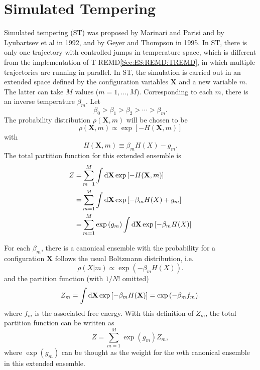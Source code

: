 \section{Simulated Tempering\label{Sec:ES:ST}}
Simulated tempering (ST) was proposed by Marinari and Parisi\cite{MarinariEPL1992} and by Lyubartsev et al\cite{LyubartsevJCP1992} in 1992, and by Geyer and Thompson\cite{GeyerJASA1995} in 1995. In ST, there is only one trajectory with controlled jumps in temperature space, which is different from the implementation of T-REMD\ref{Sec:ES:REMD:TREMD}, in which multiple trajectories are running in parallel. In ST, the simulation is carried out in an extended space defined by the configuration variables $\mathbf{X}$ and a new variable $m$. The latter can take $M$ values ($m=1,\dots,M$). Corresponding to each $m$, there is an inverse temperature $\beta_m$. Let
\begin{equation}
    \beta_0>\beta_1>\beta_2>\cdots >\beta_m.
\end{equation}
The probability distribution $\rho(\mathbf{X},m)$ will be chosen to be 
\begin{equation}
  \rho(\mathbf{X},m)\propto \exp{\left[-H(\mathbf{X},m)\right]}
\end{equation}
with 
\begin{equation}
  H(\mathbf{X},m)\equiv \beta_m H(X)-g_m.
\end{equation}
The total partition function for this extended ensemble is
\begin{align}
    Z=&\sum_{m=1}^M \int\mathop{}\!\mathrm{d} \mathbf{X} \exp{\left[-H(\mathbf{X},m)\right]}\notag\\
     =&\sum_{m=1}^M \int\mathop{}\!\mathrm{d} \mathbf{X} \exp{\left[-\beta_m H(X)+g_m\right]}\notag\\
     =&\sum_{m=1}^M \exp{(g_m)}\int\mathop{}\!\mathrm{d} \mathbf{X} \exp{\left[-\beta_m H(X)\right]}
\end{align}

For each $\beta_m$, there is a canonical ensemble with the probability for a configuration $\mathbf{X}$ follows the usual Boltzmann distribution, i.e. 
\begin{equation}
    \rho(X|m)\propto \exp{(-\beta_m H(X))}.
\end{equation}
and the partition function (with $1/N!$ omitted)
\begin{equation}
    Z_m=\int \mathop{}\!\mathrm{d} \mathbf{X} \exp{[-\beta_m H(\mathbf{X})]}=\exp{(-\beta_m f_m)}.
\end{equation}
where $f_m$ is the associated free energy. With this definition of $Z_m$, the total partition function can be written as
\begin{equation}
    Z=\sum_{m=1}^M \exp{(g_m)} Z_m,
\end{equation}
where $\exp{(g_m)}$ can be thought as the weight for the $m$th canonical ensemble in this extended ensemble.

